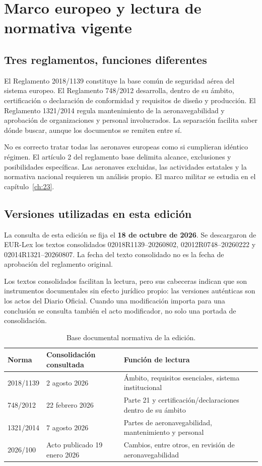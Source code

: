 \chapter{Marco europeo y lectura de normativa vigente}\label{ch:14}
\section{Tres reglamentos, funciones diferentes}
El Reglamento 2018/1139 constituye la base común de seguridad aérea del sistema europeo. El Reglamento 748/2012 desarrolla, dentro de su ámbito, certificación o declaración de conformidad y requisitos de diseño y producción. El Reglamento 1321/2014 regula mantenimiento de la aeronavegabilidad y aprobación de organizaciones y personal involucrados. La separación facilita saber dónde buscar, aunque los documentos se remiten entre sí.

No es correcto tratar todas las aeronaves europeas como si cumplieran idéntico régimen. El artículo 2 del reglamento base delimita alcance, exclusiones y posibilidades específicas. Las aeronaves excluidas, las actividades estatales y la normativa nacional requieren un análisis propio. El marco militar se estudia en el capítulo~\ref{ch:23}.
\section{Versiones utilizadas en esta edición}
La consulta de esta edición se fija el \textbf{18 de octubre de 2026}. Se descargaron de EUR-Lex los textos consolidados 02018R1139--20260802, 02012R0748--20260222 y 02014R1321--20260807. La fecha del texto consolidado no es la fecha de aprobación del reglamento original.

Los textos consolidados facilitan la lectura, pero sus cabeceras indican que son instrumentos documentales sin efecto jurídico propio: las versiones auténticas son los actos del Diario Oficial. Cuando una modificación importa para una conclusión se consulta también el acto modificador, no solo una portada de consolidación.
\begin{table}[htbp]\centering\small\caption{Base documental normativa de la edición.}\label{tab:versiones}
\begin{tabular}{p{.2\linewidth}p{.28\linewidth}p{.4\linewidth}}\toprule
Norma & Consolidación consultada & Función de lectura\\\midrule
2018/1139 & 2 agosto 2026 & Ámbito, requisitos esenciales, sistema institucional\\[4pt]
748/2012 & 22 febrero 2026 & Parte 21 y certificación/declaraciones dentro de su ámbito\\[4pt]
1321/2014 & 7 agosto 2026 & Partes de aeronavegabilidad, mantenimiento y personal\\[4pt]
2026/100 & Acto publicado 19 enero 2026 & Cambios, entre otros, en revisión de aeronavegabilidad\\\bottomrule
\end{tabular}\end{table}
